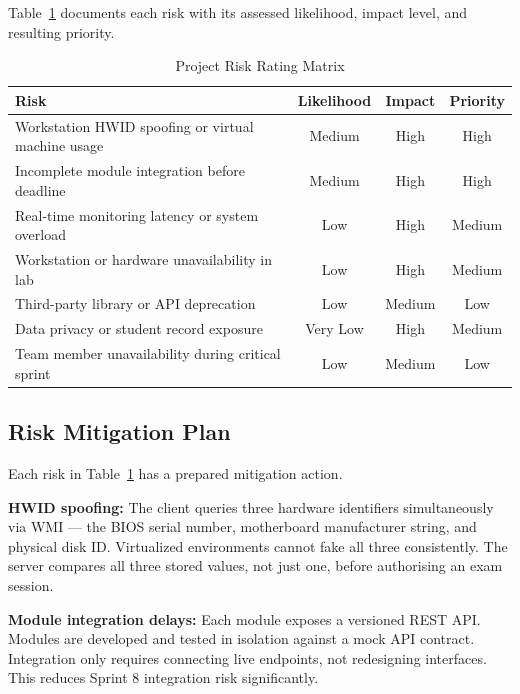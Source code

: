 Table~\ref{tab:risk_matrix} documents each risk with its assessed likelihood, impact level, and resulting priority.

\begin{table}[H]
\centering
\caption{Project Risk Rating Matrix}
\label{tab:risk_matrix}
\renewcommand{\arraystretch}{1.2}
\begin{tabular}{>{\raggedright\arraybackslash}p{7cm}|ccc}
\hline\hline
\textbf{Risk} & \textbf{Likelihood} & \textbf{Impact} & \textbf{Priority} \\ \hline
Workstation HWID spoofing or virtual machine usage & Medium & High & High \\
Incomplete module integration before deadline         & Medium & High & High \\
Real-time monitoring latency or system overload       & Low    & High & Medium \\
Workstation or hardware unavailability in lab         & Low    & High & Medium \\
Third-party library or API deprecation                & Low    & Medium & Low \\
Data privacy or student record exposure               & Very Low & High & Medium \\
Team member unavailability during critical sprint     & Low    & Medium & Low \\ \hline\hline
\end{tabular}
\end{table}

\subsection{Risk Mitigation Plan}

Each risk in Table~\ref{tab:risk_matrix} has a prepared mitigation action.

\textbf{HWID spoofing:} The client queries three hardware identifiers simultaneously via WMI — the BIOS serial number, motherboard manufacturer string, and physical disk ID. Virtualized environments cannot fake all three consistently. The server compares all three stored values, not just one, before authorising an exam session.

\textbf{Module integration delays:} Each module exposes a versioned REST API. Modules are developed and tested in isolation against a mock API contract. Integration only requires connecting live endpoints, not redesigning interfaces. This reduces Sprint 8 integration risk significantly.

